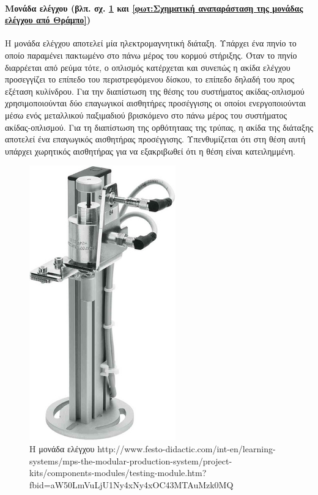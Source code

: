 \documentclass[a4paper,12pt,twoside]{report}
\begin{document}
{				\paragraph{Μονάδα ελέγχου {\footnotesize (βλπ. σχ. \ref{φωτ:Η μονάδα ελέγχου από Festo} και \ref{φωτ:Σχηματική αναπαράσταση της μονάδας ελέγχου από Θράμπο})}} {Η μονάδα ελέγχου αποτελεί μία \gls{ηλεκτρομαγνητική διάταξη}. Υπάρχει ένα πηνίο το οποίο παραμένει πακτωμένο στο πάνω μέρος του κορμού στήριξης. Όταν το πηνίο διαρρέεται από ρεύμα τότε, ο οπλισμός κατέρχεται και συνεπώς η ακίδα ελέγχου προσεγγίζει το επίπεδο του περιστρεφόμενου δίσκου, το επίπεδο δηλαδή του προς εξέταση κυλίνδρου. Για την διαπίστωση της θέσης του συστήματος ακίδας-οπλισμού χρησιμοποιούνται δύο επαγωγικοί αισθητήρες προσέγγισης οι οποίοι ενεργοποιούνται μέσω ενός μεταλλικού παξιμαδιού βρισκόμενο στο πάνω μέρος του συστήματος ακίδας-οπλισμού. Για τη διαπίστωση της ορθότηταας της τρύπας, η ακίδα της διάταξης αποτελεί ένα επαγωγικός αισθητήρας προσέγγισης.  Υπενθυμίζεται ότι στη θέση αυτή υπάρχει χωρητικός αισθητήρας για να εξακριβωθεί ότι η θέση είναι κατειλημμένη.
				}
				\begin{figure}[hp]
					\centering
					\includegraphics[scale=0.5]{ProcessingStationTestingModuleFesto.png}
					\caption{Η μονάδα ελέγχου {\footnotesize http://www.festo-didactic.com/int-en/learning-systems/mps-the-modular-production-system/project-kits/components-modules/testing-module.htm?fbid=aW50LmVuLjU1Ny4xNy4xOC43MTAuMzk0MQ}}
					\label{φωτ:Η μονάδα ελέγχου από Festo}
				\end{figure}
				
}
\end{document}
